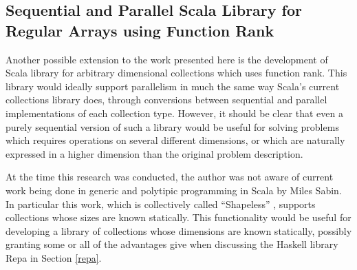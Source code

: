 \subsection{Sequential and Parallel Scala Library for Regular Arrays using Function Rank}
Another possible extension to the work presented here 
is the development of Scala library for arbitrary dimensional collections which uses function rank. 
This library would ideally support parallelism in much the same way 
Scala's current collections library does\cite{pc},
through conversions between sequential and parallel implementations of each collection type. 
However, it should be clear that even 
a purely sequential version of such a library would be useful 
for solving problems which requires operations on several different dimensions, 
or which are naturally expressed in a higher dimension than the original problem description.

At the time this research was conducted, 
the author was not aware of current work being done in 
generic and polytipic programming in Scala by Miles Sabin. 
In particular this work, which is collectively called ``Shapeless''%
, supports collections whose sizes are known statically. 
This functionality would be useful for developing 
a library of collections whose dimensions are known statically, 
possibly granting some or all of the advantages give when discussing 
the Haskell library Repa \cite{dph} in Section \ref{repa}.



